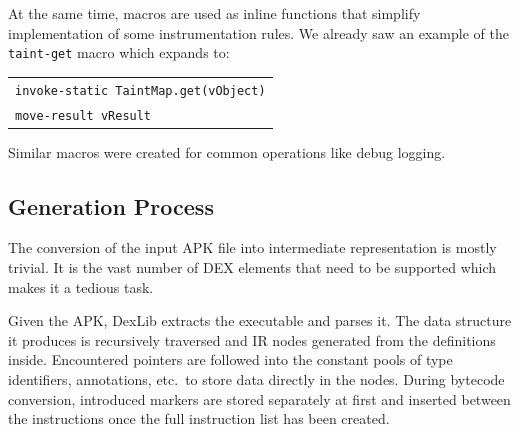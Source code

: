 \documentclass[12pt,twoside,notitlepage]{report}
\newcommand{\centerbox}[1] {
	\begin{center}
	\begin{footnotesize}
	\begin{tabular}{l}
	#1
	\end{tabular}
	\end{footnotesize}
	\end{center}
}
\newcommand{\asm}[1] {\texttt{#1}}
\begin{document}
At the same time, macros are used as inline functions that simplify implementation of some instrumentation rules. We already saw an example of the \verb$taint-get$ macro which expands to:
	\centerbox{
		\asm{invoke-static TaintMap.get(vObject)} \\
		\asm{move-result vResult}
	}
Similar macros were created for common operations like debug logging.

\subsection{Generation Process}

The conversion of the input APK file into intermediate representation is mostly trivial. It is the vast number of DEX elements that need to be supported which makes it a tedious task. 

Given the APK, DexLib extracts the executable and parses it. The data structure it produces is recursively traversed and IR nodes generated from the definitions inside. Encountered pointers are followed into the constant pools of type identifiers, annotations, etc.\ to store data directly in the nodes. During bytecode conversion, introduced markers are stored separately at first and inserted between the instructions once the full instruction list has been created.



\end{document}
